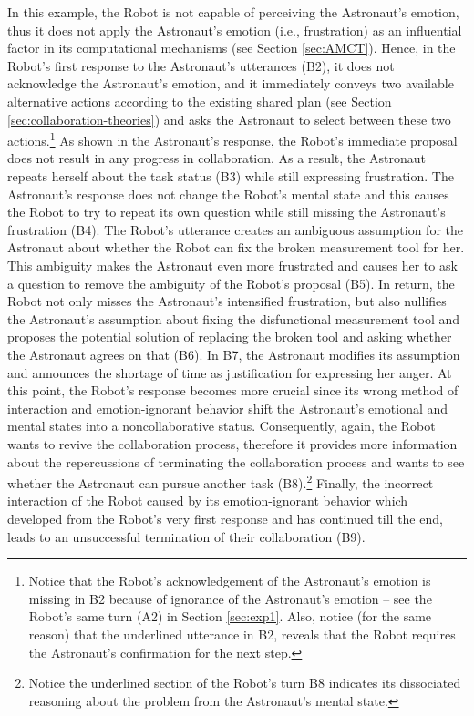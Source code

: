 In this example, the Robot is not capable of perceiving the Astronaut's emotion,
thus it does not apply the Astronaut's emotion (i.e., frustration) as an
influential factor in its computational mechanisms (see Section \ref{sec:AMCT}).
Hence, in the Robot's first response to the Astronaut's utterances (B2), it does
not acknowledge the Astronaut's emotion, and it immediately conveys two
available alternative actions according to the existing shared plan (see Section
\ref{sec:collaboration-theories}) and asks the Astronaut to select between these
two actions.\footnote{Notice that the Robot's acknowledgement of the Astronaut's
emotion is missing in B2 because of ignorance of the Astronaut's emotion -- see
the Robot's same turn (A2) in Section \ref{sec:exp1}. Also, notice (for the same
reason) that the underlined utterance in B2, reveals that the Robot requires the
Astronaut's confirmation for the next step.} As shown in the Astronaut's
response, the Robot's immediate proposal does not result in any progress in
collaboration. As a result, the Astronaut repeats herself about the task status
(B3) while still expressing frustration. The Astronaut's response does not
change the Robot's mental state and this causes the Robot to try to repeat its
own question while still missing the Astronaut's frustration (B4). The Robot's
utterance creates an ambiguous assumption for the Astronaut about whether the
Robot can fix the broken measurement tool for her. This ambiguity makes the
Astronaut even more frustrated and causes her to ask a question to remove the
ambiguity of the Robot's proposal (B5). In return, the Robot not only misses the
Astronaut's intensified frustration, but also nullifies the Astronaut's
assumption about fixing the disfunctional measurement tool and proposes the
potential solution of replacing the broken tool and asking whether the Astronaut
agrees on that (B6). In B7, the Astronaut modifies its assumption and announces
the shortage of time as justification for expressing her anger. At this point,
the Robot's response becomes more crucial since its wrong method of interaction
and emotion-ignorant behavior shift the Astronaut's emotional and mental states
into a noncollaborative status. Consequently, again, the Robot wants to revive
the collaboration process, therefore it provides more information about the
repercussions of terminating the collaboration process and wants to see whether
the Astronaut can pursue another task (B8).\footnote{Notice the underlined
section of the Robot's turn B8 indicates its dissociated reasoning about the
problem from the Astronaut's mental state.} Finally, the incorrect interaction
of the Robot caused by its emotion-ignorant behavior which developed from the
Robot's very first response and has continued till the end, leads to an
unsuccessful termination of their collaboration (B9).\\

